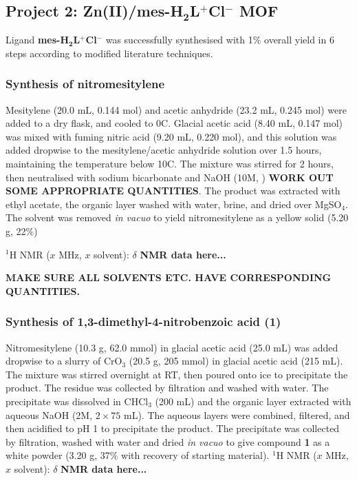 \documentclass[12pt,a4paper]{article}
\begin{document}
\subsection{Project 2: Zn(II)/\textbf{mes-H$\bm{_2}$L$\bm{^+}$Cl$\bm{^-}$} MOF}\label{synth:p2}
Ligand \textbf{mes-H$\bm{_2}$L$\bm{^+}$Cl$\bm{^-}$} was successfully synthesised with 1\% overall yield in 6 steps according to modified literature techniques\cite{nishioka2010effect,nickerl2012selective}.

\subsubsection{Synthesis of nitromesitylene}\label{synth:mes-L-step1}
Mesitylene (20.0 mL, 0.144 mol) and acetic anhydride (23.2 mL, 0.245 mol) were added to a dry flask, and cooled to 0\degree C. Glacial acetic acid (8.40 mL, 0.147 mol) was mixed with fuming nitric acid (9.20 mL, 0.220 mol), and this solution was added dropwise to the mesitylene/acetic anhydride solution over 1.5 hours, maintaining the temperature below 10\degree C. The mixture was stirred for 2 hours, then neutralised with sodium bicarbonate and NaOH (10M, ) \textbf{WORK OUT SOME APPROPRIATE QUANTITIES}. The product was extracted with ethyl acetate, the organic layer washed with water, brine, and dried over MgSO$_4$. The solvent was removed \emph{in vacuo} to yield nitromesitylene as a yellow solid (5.20 g, 22\%)

 $^1$H NMR ($x$ MHz, $x$ solvent): $\delta$ \textbf{NMR data here...}

\textbf{MAKE SURE ALL SOLVENTS ETC. HAVE CORRESPONDING QUANTITIES.}


\subsubsection{Synthesis of 1,3-dimethyl-4-nitrobenzoic acid \textbf{(1)}}\label{synth:mes-L-step2}
Nitromesitylene (10.3 g, 62.0 mmol) in glacial acetic acid (25.0 mL) was added dropwise to a slurry of CrO$_3$ (20.5 g, 205 mmol) in glacial acetic acid (215 mL). The mixture was stirred overnight at RT, then poured onto ice to precipitate the product. The residue was collected by filtration and washed with water. The precipitate was dissolved in CHCl$_3$ (200 mL) and the organic layer extracted with aqueous NaOH (2M, $2\times 75$ mL). The aqueous layers were combined, filtered, and then acidified to pH 1 to precipitate the product. The precipitate was collected by filtration, washed with water and dried \emph{in vacuo} to give compound \textbf{1} as a white powder (3.20 g, 37\% with recovery of starting material). $^1$H NMR ($x$ MHz, $x$ solvent): $\delta$ \textbf{NMR data here...}
\end{document}
